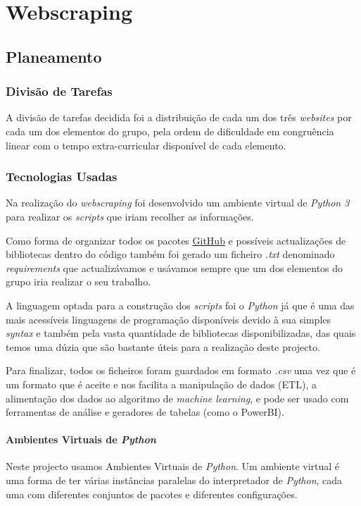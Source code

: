 \chapter{Webscraping}
\label{cap3}

\section{Planeamento}
\subsection{Divisão de Tarefas}

A divisão de tarefas decidida foi a distribuição de cada um dos três \textit{websites} por cada um dos elementos do grupo, pela ordem de dificuldade em congruência linear com o tempo extra-curricular disponível de cada elemento.

\subsection{Tecnologias Usadas}
Na realização do \textit{webscraping} foi desenvolvido um ambiente virtual de \textit{Python 3} para realizar os \textit{scripts} que iriam recolher as informações.

Como forma de organizar todos os pacotes \href{https://github.com/CatKinKitKat/pi2021}{GitHub} e possíveis actualizações de bibliotecas dentro do código também foi gerado um ficheiro \textit{.txt} denominado \textit{requirements} que actualizávamos e usávamos sempre que um dos elementos do grupo iria realizar o seu trabalho.

A linguagem optada para a construção dos \textit{scripts} foi o \textit{Python} já que é uma das mais acessíveis linguagens de programação disponíveis devido à sua simples \textit{syntax} e também pela vasta quantidade de bibliotecas disponibilizadas, das quais temos uma dúzia que são bastante úteis para a realização deste projecto.

Para finalizar, todos os ficheiros foram guardados em formato \textit{.csv} uma vez que é um formato que é aceite e nos facilita a manipulação de dados (ETL), a alimentação dos dados ao algoritmo de \textit{machine learning}, e pode ser usado com ferramentas de análise e geradores de tabelas (como o PowerBI).

\subsubsection{Ambientes Virtuais de \textit{Python}}
Neste projecto usamos Ambientes Virtuais de \textit{Python}. Um ambiente virtual é uma forma de ter várias instâncias paralelas do interpretador de \textit{Python}, cada uma com diferentes conjuntos de pacotes e diferentes configurações.

